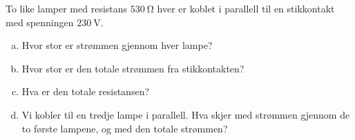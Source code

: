 %
To like lamper med resistans $\SI{530}{\ohm}$ hver er koblet i parallell til en stikkontakt med spenningen $\SI{230}{\volt}$.
\begin{enumerate}[a)]
    \item Hvor stor er strømmen gjennom hver lampe?
    \item Hvor stor er den totale strømmen fra stikkontakten?
    \item Hva er den totale resistansen?
    \item Vi kobler til en tredje lampe i parallell. Hva skjer med strømmen gjennom de to første lampene, og med den totale strømmen?
\end{enumerate}
%
